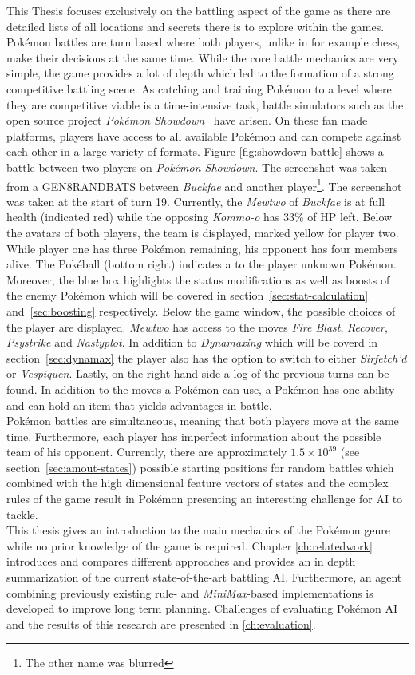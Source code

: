 This Thesis focuses exclusively on the battling aspect of the game as there are detailed lists of all locations and
secrets there is to explore within the games. Pokémon battles are turn based where both players, unlike in 
for example chess, make their decisions at the same time. While the core battle mechanics are very simple, 
the game provides a lot of depth which led to the formation of a strong competitive battling scene.
As catching and training Pokémon to a level where they are competitive viable is a time-intensive task, battle
simulators such as the open source project \textit{Pokémon Showdown}~\autocite{Showdown:Github} have arisen. On these fan made
platforms, players have access to all available Pokémon and can compete against each other in a large variety
of formats.
Figure \ref{fig:showdown-battle} shows a battle between two players on 
\textit{Pokémon Showdown}. The screenshot was taken from a \ac{GEN8RANDBATS} between 
\textit{Buckfae} and another player\footnote{The other name was blurred}. The screenshot was taken
at the start of turn 19. Currently, the \textit{Mewtwo} of \textit{Buckfae} is at full health (indicated
red) while the opposing \textit{Kommo-o} has 33\% of \ac{HP} left. Below the avatars of both players,
the team is displayed, marked yellow for player two. While player one has three Pokémon remaining,
his opponent has four members alive. The Pokéball (bottom right) indicates a to the player unknown Pokémon.
Moreover, the blue box highlights the status modifications as well as boosts of the enemy Pokémon which will be
covered in section~\ref{sec:stat-calculation} and~\ref{sec:boosting} respectively.
Below the game window, the possible choices of the
player are displayed. \textit{Mewtwo} has access to the moves \textit{Fire Blast}, \textit{Recover}, \textit{Psystrike}
and \textit{Nastyplot}. In addition to \textit{Dynamaxing} which will be coverd in section~\ref{sec:dynamax} the player
also has the option to switch to either \textit{Sirfetch'd} or \textit{Vespiquen}. Lastly,
on the right-hand side a log of the previous turns can be found. In addition to the moves a Pokémon can use,
a Pokémon has one ability and can hold an item that yields advantages in battle. 
\\
Pokémon battles are simultaneous, meaning that both players move at the same time. Furthermore, each player has imperfect
information about the possible team of his opponent. 
Currently, there are approximately $1.5 \times 10^{39}$ 
(see section~\ref{sec:amout-states}) possible
starting positions for random battles which combined with the high dimensional feature vectors of states 
and the complex rules of the game result in Pokémon presenting an interesting challenge for AI to tackle. 
\\
This thesis gives an introduction to the main mechanics of the Pokémon genre while no prior knowledge of the 
game is required. 
Chapter \ref{ch:relatedwork} introduces and compares different approaches and provides an in depth summarization
of the current state-of-the-art battling AI. 
Furthermore, an agent combining previously existing rule- and 
\textit{MiniMax}-based implementations is developed to improve long term planning.
Challenges of evaluating Pokémon AI and the results of this research
are presented in \ref{ch:evaluation}.